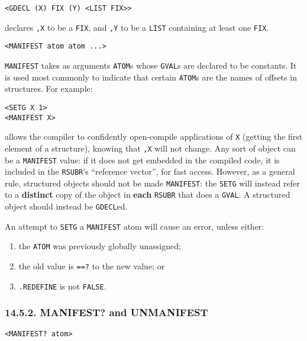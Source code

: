\documentclass[a4paper,]{article}
\providecommand{\tightlist}{%
  \setlength{\itemsep}{0pt}\setlength{\parskip}{0pt}}
\begin{document}
\begin{verbatim}
<GDECL (X) FIX (Y) <LIST FIX>>
\end{verbatim}

declares \texttt{,X} to be a \texttt{FIX}, and \texttt{,Y} to be a \texttt{LIST} containing at least one \texttt{FIX}.

\begin{verbatim}
<MANIFEST atom atom ...>
\end{verbatim}

\texttt{MANIFEST} takes as arguments \texttt{ATOM}s whose \texttt{GVAL}s are declared to be constants. It is used most
commonly to indicate that certain \texttt{ATOM}s are the names of offsets in structures. For example:

\begin{verbatim}
<SETG X 1>
<MANIFEST X>
\end{verbatim}

allows the compiler to confidently open-compile applications of \texttt{X} (getting the first element of a structure),
knowing that \texttt{,X} will not change. Any sort of object can be a \texttt{MANIFEST} value: if it does not get embedded
in the compiled code, it is included in the \texttt{RSUBR}'s ``reference vector'', for fast access. However, as a general
rule, structured objects should not be made \texttt{MANIFEST}: the \texttt{SETG} will instead refer to a \textbf{distinct}
copy of the object in \textbf{each} \texttt{RSUBR} that does a \texttt{GVAL}. A structured object should instead be
\texttt{GDECL}ed.

An attempt to \texttt{SETG} a \texttt{MANIFEST} atom will cause an error, unless either:

\begin{enumerate}
\def\labelenumi{\arabic{enumi}.}
\tightlist
\item
  the \texttt{ATOM} was previously globally unassigned;
\item
  the old value is \texttt{==?} to the new value; or
\item
  \texttt{.REDEFINE} is not \texttt{FALSE}.
\end{enumerate}

\subsubsection{14.5.2. MANIFEST? and UNMANIFEST}\label{manifest-and-unmanifest}

\begin{verbatim}
<MANIFEST? atom>
\end{verbatim}
\end{document}
